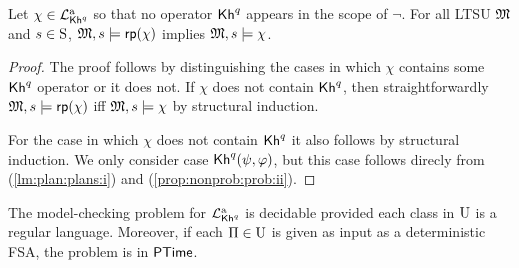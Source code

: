 \begin{proposition}\label{prop:Khunc:PKhadapt}
  Let $\chi\in\PKhadapt$ so that no operator $\kh^q$ appears in the
  scope of $\neg$.  For all LTSU $\model$
  and $s\in\S$, $\model,s\models\fgetprob(\chi)$ implies
  $\model,s\models\chi$.
\end{proposition}
%
\begin{proof}
  The proof follows by distinguishing the cases in which $\chi$
  contains some $\kh^q$ operator or it does not.
  If $\chi$ does not contain $\kh^q$, then straightforwardly
  $\model,s\models\fgetprob(\chi)$ iff $\model,s\models\chi$ by
  structural induction.

  For the case in which $\chi$ does not contain $\kh^q$ it also
  follows by structural induction.  We only consider case
  $\kh^q(\psi,\varphi)$, but this case follows direcly from
   (\cref{lm:plan:plans:i}) and
   (\cref{prop:nonprob:prob:ii}).
\end{proof}



\begin{theorem}\label{th:PKhadapt:mc}
  The model-checking problem for $\PKhadapt$ is decidable provided
  each class in $\Unc$ is a regular language. Moreover, if each
  $\plans\in\Unc$ is given as input as a deterministic FSA, the
  problem is in $\PTIME$.
\end{theorem}







